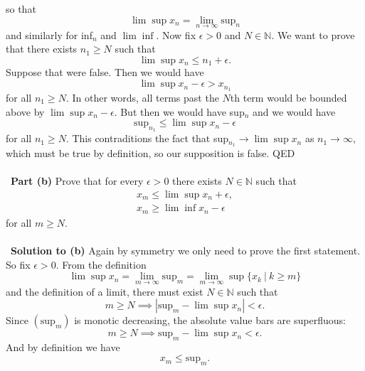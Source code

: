 \documentclass[12 pt]{article}
\newcommand{\N}{\mathbb{N}}
\numberwithin{equation}{section}
\begin{document}
{so that \begin{equation*}
\lim \sup x_n = \lim_{n \to \infty} \mbox{sup}_n
\end{equation*}
and similarly for inf$_n$ and $\lim \inf$. Now fix $\epsilon > 0$ and $N \in \N$. We want to prove that there exists $n_1 \geq N$ such that \begin{equation*}
\lim \sup x_n \leq {n_1} + \epsilon.
\end{equation*}
Suppose that were false. Then we would have \begin{equation*}
\lim \sup x_n - \epsilon > x_{n_1}
\end{equation*}
for all $n_1 \geq N$. In other words, all terms past the $N$th term would be bounded above by $\lim \sup x_n - \epsilon$. But then we would have sup$_n$ and we would have \begin{equation*}
\mbox{sup}_{n_1} \leq  \lim \sup x_n - \epsilon
\end{equation*}
for all $n_1 \geq N$. This contraditions the fact that sup$_{n_1} \to \lim \sup x_n$ as $n_1 \to \infty$, which must be true by definition, so our supposition is false. QED\\
\\
\
\textbf{Part (b)} Prove that for every $\epsilon > 0$ there exists $N \in \N$ such that \begin{align*}
x_m \leq \lim \sup x_n + \epsilon, \\
x_m \geq \lim \inf x_n - \epsilon
\end{align*}
for all $m \geq N$.\\
\\
\
\textbf{Solution to (b)} Again by symmetry we only need to prove the first statement. So fix $\epsilon > 0$. From the definition \begin{equation*}
\lim \sup x_n = \lim_{m \to \infty} \mbox{sup}_m = \lim _{m \to \infty} \sup \{ x_k \ | \ k \geq m \}
\end{equation*}
and the definition of a limit, there must exist $N \in \N$ such that \begin{equation*}
m \geq N \implies |\mbox{sup}_m - \lim \sup x_n | < \epsilon.
\end{equation*}
Since $(\mbox{sup}_m)$ is monotic decreasing, the absolute value bars are superfluous: \begin{equation*}
m \geq N \implies \mbox{sup}_m - \lim \sup x_n < \epsilon.
\end{equation*}
And by definition we have \begin{equation*}
x_m \leq \mbox{sup}_m.

\end{equation*}}
\end{document}
